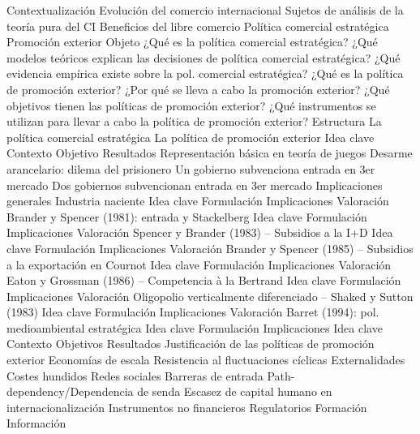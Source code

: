 \documentclass{nuevotema}
\begin{document}
\begin{esquema}[enumerate]
	\1[] 
		\2 Contextualización
			\3 Evolución del comercio internacional
			\3 Sujetos de análisis de la teoría pura del CI
			\3 Beneficios del libre comercio
			\3 Política comercial estratégica
			\3 Promoción exterior
		\2 Objeto
			\3 ¿Qué es la política comercial estratégica?
			\3 ¿Qué modelos teóricos explican las decisiones de política comercial estratégica?
			\3 ¿Qué evidencia empírica existe sobre la pol. comercial estratégica?
			\3 ¿Qué es la política de promoción exterior?
			\3 ¿Por qué se lleva a cabo la promoción exterior?
			\3 ¿Qué objetivos tienen las políticas de promoción exterior?
			\3 ¿Qué instrumentos se utilizan para llevar a cabo la política de promoción exterior?
		\2 Estructura
			\3 La política comercial estratégica
			\3 La política de promoción exterior
	\1 
		\2 Idea clave
			\3 Contexto
			\3 Objetivo
			\3 Resultados
		\2 Representación básica en teoría de juegos
			\3 Desarme arancelario: dilema del prisionero
			\3 Un gobierno subvenciona entrada en 3er mercado
			\3 Dos gobiernos subvencionan entrada en 3er mercado
			\3 Implicaciones generales
		\2 Industria naciente
			\3 Idea clave
			\3 Formulación
			\3 Implicaciones
			\3 Valoración
		\2 Brander y Spencer (1981): entrada y Stackelberg
			\3 Idea clave
			\3 Formulación
			\3 Implicaciones
			\3 Valoración
		\2 Spencer y Brander (1983) -- Subsidios a la I+D
			\3 Idea clave
			\3 Formulación
			\3 Implicaciones
			\3 Valoración
		\2 Brander y Spencer (1985) -- Subsidios a la exportación en Cournot
			\3 Idea clave
			\3 Formulación
			\3 Implicaciones
			\3 Valoración
		\2 Eaton y Grossman (1986) -- Competencia à la Bertrand
			\3 Idea clave
			\3 Formulación
			\3 Implicaciones
			\3 Valoración
		\2 Oligopolio verticalmente diferenciado -- Shaked y Sutton (1983)
			\3 Idea clave
			\3 Formulación
			\3 Implicaciones
			\3 Valoración
		\2 Barret (1994): pol. medioambiental estratégica
			\3 Idea clave
			\3 Formulación
			\3 Implicaciones
	\1 
		\2 Idea clave
			\3 Contexto
			\3 Objetivos
			\3 Resultados
		\2 Justificación de las políticas de promoción exterior
			\3 Economías de escala
			\3 Resistencia al fluctuaciones cíclicas
			\3 Externalidades
			\3 Costes hundidos
			\3 Redes sociales
			\3 Barreras de entrada
			\3 Path-dependency/Dependencia de senda
			\3 Escasez de capital humano en internacionalización
		\2 Instrumentos no financieros
			\3 Regulatorios
			\3 Formación
			\3 Información

\end{esquema}
\end{document}
